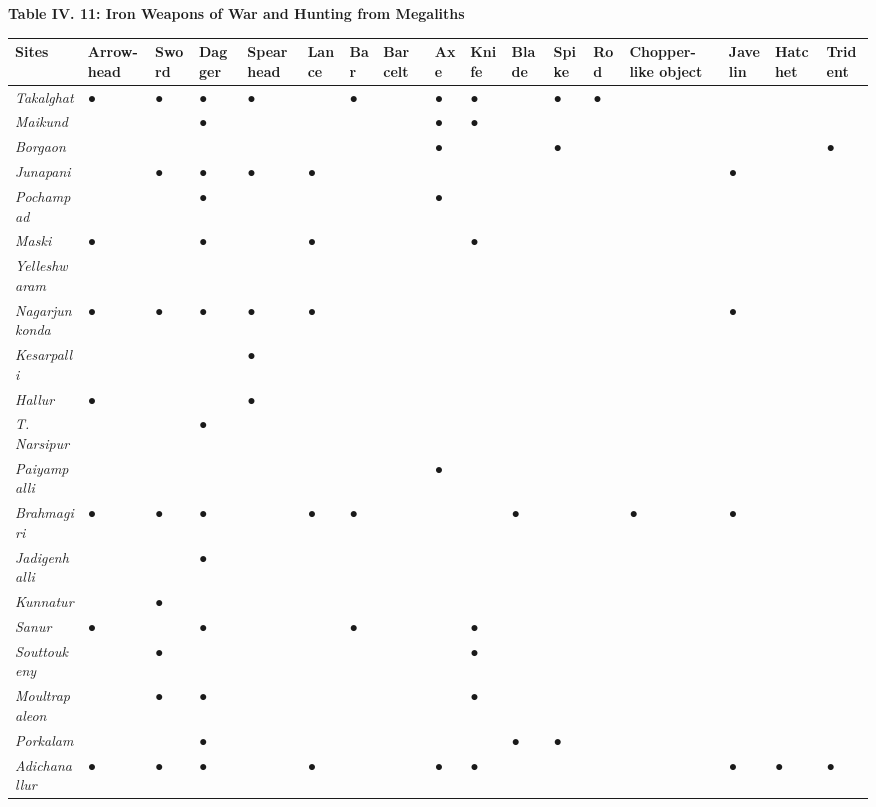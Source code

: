 \textbf{Table IV. 11: Iron Weapons of War and Hunting from Megaliths}

\begin{longtable}{|l|l|l|l|l|l|l|l|l|l|l|l|l|l|l|l|l|}
\hline
Sites & Arrow-head & Sword & Dagger & Spearhead & Lance & Bar & Bar celt & Axe & Knife & Blade & Spike & Rod & Chopper-like object & Javelin & Hatchet & Trident \\
\hline
\textit{Takalghat} & ● & ● & ● & ● &  & ● &  & ● & ● &  & ● & ● &  &  &  &  \\
\hline
\textit{Maikund} &  &  & ● &  &  &  &  & ● & ● &  &  &  &  &  &  &  \\
\hline
\textit{Borgaon} &  &  &  &  &  &  &  & ● &  &  & ● &  &  &  &  & ● \\
\hline
\textit{Junapani} &  & ● & ● & ● & ● &  &  &  &  &  &  &  &  & ● &  &  \\
\hline
\textit{Pochampad} &  &  & ● &  &  &  &  & ● &  &  &  &  &  &  &  &  \\
\hline
\textit{Maski} & ● &  & ● &  & ● &  &  &  & ● &  &  &  &  &  &  &  \\
\hline
\textit{Yelleshwaram} &  &  &  &  &  &  &  &  &  &  &  &  &  &  &  &  \\
\hline
\textit{Nagarjunkonda} & ● & ● & ● & ● & ● &  &  &  &  &  &  &  &  & ● &  &  \\
\hline
\textit{Kesarpalli} &  &  &  & ● &  &  &  &  &  &  &  &  &  &  &  &  \\
\hline
\textit{Hallur} & ● &  &  & ● &  &  &  &  &  &  &  &  &  &  &  &  \\
\hline
\textit{T. Narsipur} &  &  & ● &  &  &  &  &  &  &  &  &  &  &  &  &  \\
\hline
\textit{Paiyampalli} &  &  &  &  &  &  &  & ● &  &  &  &  &  &  &  &  \\
\hline
\textit{Brahmagiri} & ● & ● & ● &  & ● & ● &  &  &  & ● &  &  & ● & ● &  &  \\
\hline
\textit{Jadigenhalli} &  &  & ● &  &  &  &  &  &  &  &  &  &  &  &  &  \\
\hline
\textit{Kunnatur} &  & ● &  &  &  &  &  &  &  &  &  &  &  &  &  &  \\
\hline
\textit{Sanur} & ● &  & ● &  &  & ● &  &  & ● &  &  &  &  &  &  &  \\
\hline
\textit{Souttoukeny} &  & ● &  &  &  &  &  &  & ● &  &  &  &  &  &  &  \\
\hline
\textit{Moultrapaleon} &  & ● & ● &  &  &  &  &  & ● &  &  &  &  &  &  &  \\
\hline
\textit{Porkalam} &  &  & ● &  &  &  &  &  &  & ● & ● &  &  &  &  &  \\
\hline
\textit{Adichanallur} & ● & ● & ● &  & ● &  &  & ● & ● &  &  &  &  & ● & ● & ● \\
\hline
\end{longtable}

